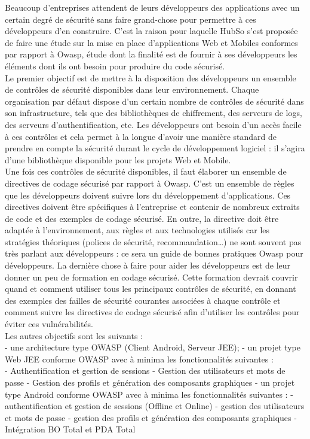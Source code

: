 Beaucoup d’entreprises attendent de leurs développeurs des applications avec un certain degré de sécurité sans faire grand-chose pour permettre à ces développeurs d’en construire. C'est la raison pour laquelle HubSo s'est proposée de faire une étude sur la mise en place d'applications Web et Mobiles conformes par rapport à Owasp, étude dont la finalité est de fournir à ses développeurs les éléments dont ils ont besoin pour produire du code sécurisé. \\
Le premier objectif est de mettre à la disposition des développeurs un ensemble de contrôles de sécurité disponibles dans leur environnement. Chaque organisation par défaut dispose d’un certain nombre de contrôles de sécurité dans son infrastructure, tels que des bibliothèques de chiffrement, des serveurs de logs, des serveurs d'authentification, etc. Les développeurs ont besoin d'un accès facile à ces contrôles et cela permet à la longue d’avoir une manière standard de prendre en compte la sécurité durant le cycle de développement logiciel : il s'agira d'une bibliothèque disponible pour les projets Web et Mobile.\\
Une fois ces contrôles de sécurité disponibles, il faut élaborer un ensemble de directives de codage sécurisé par rapport à Owasp. C'est un ensemble de règles que les développeurs doivent suivre lors du développement d'applications. Ces directives doivent être spécifiques à l’entreprise et contenir de nombreux extraits de code et des exemples de codage sécurisé. En outre, la directive doit être adaptée à l’environnement, aux règles et aux technologies utilisés car les stratégies théoriques (polices de sécurité, recommandation…) ne sont souvent pas très parlant aux développeurs : ce sera un guide de bonnes pratiques Owasp pour développeurs.
La dernière chose à faire pour aider les développeurs est de leur donner un peu de formation en codage sécurisé. Cette formation devrait couvrir quand et comment utiliser tous les principaux contrôles de sécurité, en donnant des exemples des failles de sécurité courantes associées à chaque contrôle et comment suivre les directives de codage sécurisé afin d'utiliser les contrôles pour éviter ces vulnérabilités.\\
Les autres objectifs sont les suivants :\\
- une architecture type OWASP (Client Android, Serveur JEE);
- un projet type Web JEE conforme OWASP avec à minima les fonctionnalités suivantes : \\
	- Authentification et gestion de sessions
	- Gestion des utilisateurs et mots de passe
	- Gestion des profils et génération des composants graphiques
- un projet type Android conforme OWASP avec à minima les fonctionnalités suivantes :
	- authentification et gestion de sessions (Offline et Online)
	- gestion des utilisateurs et mots de passe
	- gestion des profils et génération des composants graphiques
- Intégration BO Total et PDA Total


